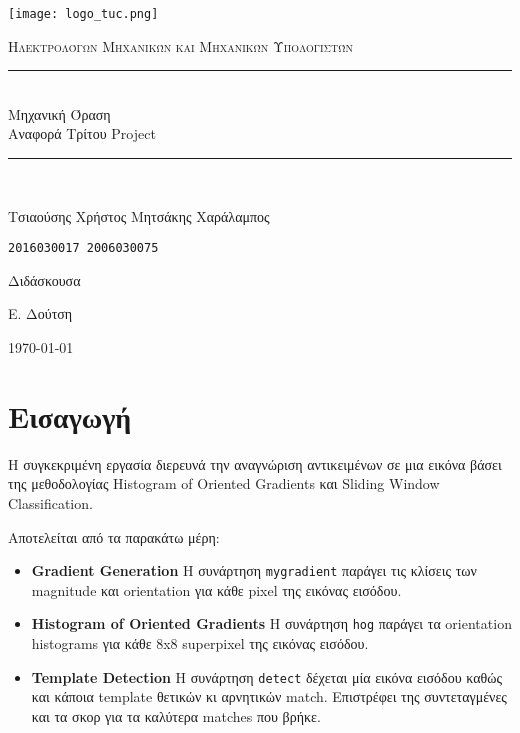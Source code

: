 \documentclass[11pt]{scrartcl} %
\begin{document}
\begin{titlepage}
    \centering
    \texttt{[image: logo\_tuc.png]}\par\vspace{1cm}
    \normalfont\normalsize
    \textsc{\textcolor[rgb]{0.66, 0.09, 0.19}{Ηλεκτρολόγων Μηχανικών και Μηχανικών Υπολογιστών}}\\ %
    \vspace{25pt} %
    \rule{\linewidth}{0.5pt}\\ %
    \vspace{20pt} %
    {\Huge Μηχανική Όραση}\\ %

    {\huge Αναφορά Τρίτου Project}\\ %
    \vspace{12pt} %
    \rule{\linewidth}{2pt}\\ %
    \vspace{12pt} %
    \vspace{2cm}

    {\LARGE{Τσιαούσης Χρήστος \hfill Μητσάκης Χαράλαμπος}
        \par
        \texttt{2016030017 \hfill 2006030075}
        \par
    }

    \vfill
    Διδάσκουσα

    Ε. Δούτση

    \vfill

    {\large \today\par}
\end{titlepage}

\newpage



\section{Εισαγωγή}

Η συγκεκριμένη εργασία διερευνά την αναγνώριση αντικειμένων σε μια εικόνα
βάσει της μεθοδολογίας Histogram of Oriented Gradients και Sliding Window Classification.

Αποτελείται από τα παρακάτω μέρη:
\begin{itemize}
  \item \textbf{Gradient Generation} Η συνάρτηση \texttt{mygradient} παράγει τις κλίσεις των
  magnitude και orientation για κάθε pixel της εικόνας εισόδου.
  \item \textbf{Histogram of Oriented Gradients} Η συνάρτηση \texttt{hog} παράγει τα orientation
  histograms για κάθε 8x8 superpixel της εικόνας εισόδου.
  \item \textbf{Template Detection} Η συνάρτηση \texttt{detect} δέχεται μία εικόνα εισόδου καθώς
  και κάποια template θετικών κι αρνητικών match. Επιστρέφει της συντεταγμένες και τα σκορ για
  τα καλύτερα matches που βρήκε.
\end{itemize}
\end{document}
